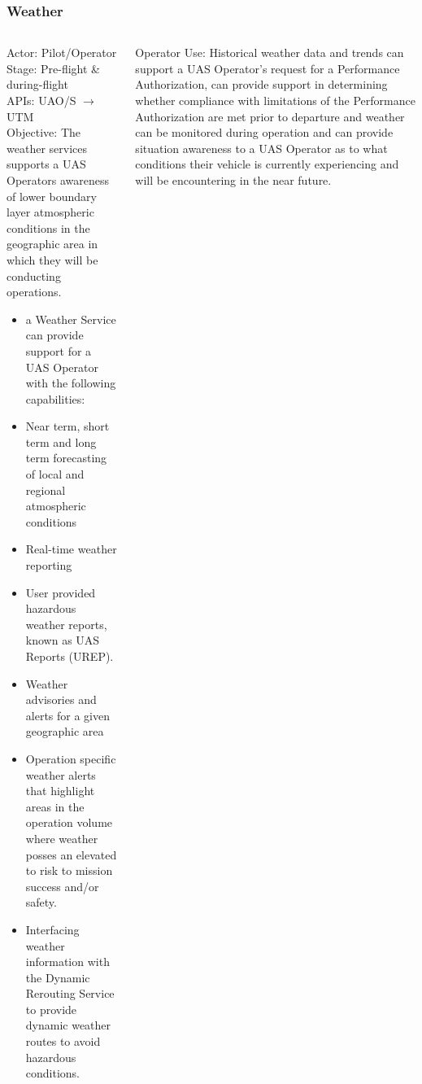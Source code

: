 \documentclass[usenames,dvipsnames,aspectratio=169,serif]{beamer}
\begin{document}
\begin{frame}
   \frametitle{Weather}
   \begin{columns}[t]
      \begin{column}{0.5\textwidth}
         Actor: Pilot/Operator \\
         Stage: Pre-flight \& during-flight \\
         APIs: UAO/S $\rightarrow$ UTM \\
         Objective: The weather services supports a UAS Operators awareness of lower boundary layer atmospheric conditions in the geographic area in which they will be conducting operations.
         \begin{itemize}
         \item  a Weather Service can provide support for a UAS Operator with the following capabilities:
         \item  Near term, short term and long term forecasting of local and regional atmospheric conditions
         \item  Real-time weather reporting
         \item  User provided hazardous weather reports, known as UAS Reports (UREP).
         \item  Weather advisories and alerts for a given geographic area
         \item  Operation specific weather alerts that highlight areas in the operation volume where weather posses an elevated to risk to mission success and/or safety.
         \item  Interfacing weather information with the Dynamic Rerouting Service to provide dynamic weather routes to avoid hazardous conditions.
         \end{itemize}
      \end{column}
      \begin{column}{0.5\textwidth}
         Operator Use:
         Historical weather data and trends can support a UAS Operator's request for a Performance Authorization, can provide support in determining whether compliance with limitations of the Performance Authorization are met prior to departure and weather can be monitored during operation and can provide situation awareness to a UAS Operator as to what conditions their vehicle is currently experiencing and will be encountering in the near future.
      \end{column}
   \end{columns}
\end{frame}
\end{document}
